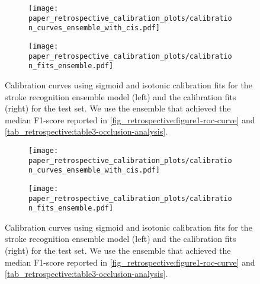 \begin{figure}
    \centering
    \begin{subfigure}[c]{0.48\columnwidth}
        \centering
        \texttt{[image: paper\_retrospective\_calibration\_plots/calibration\_curves\_ensemble\_with\_cis.pdf]}
    \end{subfigure}    
    \begin{subfigure}[c]{0.48\columnwidth}
        \centering
        \texttt{[image: paper\_retrospective\_calibration\_plots/calibration\_fits\_ensemble.pdf]}
    \end{subfigure}    
    \caption[Calibration fits and curves for the stroke recognition ensemble using Platt-scaling and isotonic regression for calibration.]{ Calibration curves using sigmoid and isotonic calibration fits for the stroke recognition ensemble model (left) and the calibration fits (right) for the test set. We use the ensemble that achieved the median F1-score reported in \cref{fig_retrospective:figure1-roc-curve} and \cref{tab_retrospective:table3-occlusion-analysis}.}
    \label{fig_discussion:retrospective-paper-calibration-curve-sigmoid-isotonic}
\end{figure}
\begin{figure}
    \begin{subfigure}[c]{0.48\columnwidth}
        \centering
        \texttt{[image: paper\_retrospective\_calibration\_plots/calibration\_curves\_ensemble\_with\_cis.pdf]}
    \end{subfigure}    
    \begin{subfigure}[c]{0.48\columnwidth}
        \centering
        \texttt{[image: paper\_retrospective\_calibration\_plots/calibration\_fits\_ensemble.pdf]}
    \end{subfigure}    
    \caption[Calibration fits and curves for the stroke recognition ensemble using Platt-scaling and isotonic regression for calibration.]{ Calibration curves using sigmoid and isotonic calibration fits for the stroke recognition ensemble model (left) and the calibration fits (right) for the test set. We use the ensemble that achieved the median F1-score reported in \cref{fig_retrospective:figure1-roc-curve} and \cref{tab_retrospective:table3-occlusion-analysis}.}
    \label{fig_discussion:retrospective-paper-calibration-curve-sigmoid-isotonic}
\end{figure}    


